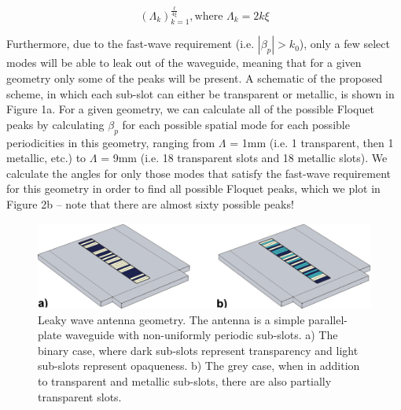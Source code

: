 \documentclass[11pt]{article}
\begin{document}

\[(\Lambda_k)^{\frac{\ell}{4\xi}}_{k=1}, \textrm{where } \Lambda_k=2k\xi \tag{2}\]

\noindent Furthermore, due to the fast-wave requirement (i.e. $|\beta_p|>k_0$), only a few select modes will be able to leak out of the waveguide, meaning that for a given geometry only some of the  peaks will be present. A schematic of the proposed scheme, in which each sub-slot can either be transparent or metallic, is shown in Figure 1a. For a given geometry, we can calculate all of the possible Floquet peaks by calculating $\beta_p$ for each possible spatial mode for each possible periodicities in this geometry, ranging from $\Lambda$ = 1mm (i.e. 1 transparent, then 1 metallic, etc.) to $\Lambda$ = 9mm (i.e. 18 transparent slots and 18 metallic slots). We calculate the angles for only those modes that satisfy the fast-wave requirement for this geometry in order to find all possible Floquet peaks, which we plot in Figure 2b -- note that there are almost sixty possible peaks!

\begin{figure}
		\centering
		\includegraphics[width = 6in]{figures/fig5pdf}
		\caption{Leaky wave antenna geometry. The antenna is a simple parallel-plate waveguide with non-uniformly periodic sub-slots. a) The binary case, where dark sub-slots represent transparency and light sub-slots represent opaqueness. b) The grey case, when in addition to transparent and metallic sub-slots, there are also partially transparent slots.}
\end{figure}
\end{document}
